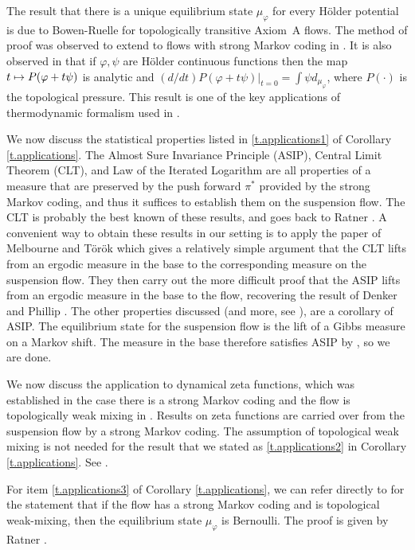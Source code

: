 \documentclass[JEP,XML,SOM,Unicode,NoFloatCountersInSection]{cedram}
\def\mto{\mathchoice{\longmapsto}{\mapsto}{\mapsto}{\mapsto}}
\theoremstyle{definition}
\numberwithin{equation}{section}
\begin{document}
The result that there is a unique equilibrium state $\mu_\varphi$ for every Hölder potential is due to Bowen-Ruelle \cite{bowen-ruelle} for topologically transitive Axiom~A flows. The method of proof was observed to extend to flows with strong Markov coding in \cite{pollicott}. It is also observed in \cite{pollicott} that if $\varphi, \psi$ are Hölder continuous functions then the map $t \mto P(\varphi + t \psi)$ is analytic and $(d/dt)P(\varphi+ t \psi)|_{t=0} = \int \psi d_{\mu_\varphi}$, where $P(\cdot)$ is the topological pressure. This result is one of the key applications of thermodynamic formalism used in \cite{bcls, aS16}.

We now discuss the statistical properties listed in \eqref{t.applications1} of Corollary \ref{t.applications}. The Almost Sure Invariance Principle (ASIP), Central Limit Theorem (CLT), and Law of the Iterated Logarithm are all properties of a measure that are preserved by the push forward $\pi^\ast$ provided by the strong Markov coding, and thus it suffices to establish them on the suspension flow. The CLT is probably the best known of these results, and goes back to Ratner \cite{ratner}.
A convenient way to obtain these results in our setting is to apply the paper of Melbourne and Török \cite{MT04} which gives a relatively simple argument that the CLT lifts from an ergodic measure in the base to the corresponding measure on the suspension flow. They then carry out the more difficult proof that the ASIP lifts from an ergodic measure in the base to the flow, recovering the result of Denker and Phillip \cite{DP84}. The other properties discussed (and more, see \cite{MT04}), are a corollary of ASIP. The equilibrium state for the suspension flow is the lift of a Gibbs measure on a Markov shift. The measure in the base therefore satisfies ASIP by \cite{DP84}, so we are done.

We now discuss the application to dynamical zeta functions, which was established in the case there is a strong Markov coding and the flow is topologically weak mixing in \cite{pollicott}. Results on zeta functions are carried over from the suspension flow by a strong Markov coding. The assumption of topological weak mixing is not needed for the result that we stated as \eqref{t.applications2} in Corollary \ref{t.applications}. See \cite[Chap.\,6]{PP}.

For item \eqref{t.applications3} of Corollary \ref{t.applications}, we can refer directly to \cite{pollicott} for the statement that if the flow has a strong Markov coding and is topological weak-mixing, then the equilibrium state $\mu_\varphi$ is Bernoulli. The proof is given by Ratner \cite{ratner2}.
\end{document}
